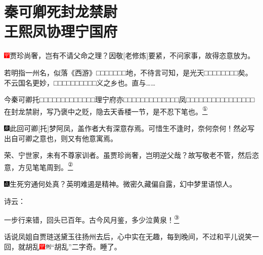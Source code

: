 

\chapter{秦可卿死封龙禁尉\\王熙凤协理宁国府}\label{part0017_split_000.htmlux5cux23calibre_pb_0}

\includegraphics[width=3mm]{../Images/00002}{贾珍尚奢，岂有不请父命之理？因敬{[}老修炼{]}要紧，不问家事，故得恣意放为。}

{若明指一州名，似落《西游》□□□□□□□地，不待言可知，是光天□□□□□□□□矣。不云国名更妙，□□□□□□□□□□义之乡也。直与\ldots{}\ldots{}}

{今秦可卿托□□□□□□□□□□□□□理宁府亦□□□□□□□□□□□□□凤□□□□□□□□□□□□□□□□在封龙禁尉，写乃褒中之贬，隐去天香楼一节，是不忍下笔也。}\href{../Text/part0017_split_000.html\#lnkback_1_a}{\textsuperscript{①}}

{{\includegraphics[width=3mm]{../Images/00004}此回可卿{[}托{]}梦阿凤，盖作者大有深意存焉。可惜生不逢时，奈何奈何！然必写出自可卿之意也，则又有他意寓焉。}}

{{荣、宁世家，未有不尊家训者。虽贾珍尚奢，岂明逆父哉？故写敬老不管，然后恣意，方见笔笔周到。}}\href{../Text/part0017_split_000.html\#lnkback_2_a}{\textsuperscript{②}}

{\includegraphics[width=3mm]{../Images/00005}生死穷通何处真？英明难遏是精神。微密久藏偏自露，幻中梦里语惊人。}

诗云：

一步行来错，回头已百年。古今风月鉴，多少泣黄泉！\href{../Text/part0017_split_000.html\#lnkback_3_a}{\textsuperscript{③}}

话说凤姐自贾琏送黛玉往扬州去后，心中实在无趣，每到晚间，不过和平儿说笑一回，就胡乱{\includegraphics[width=3mm]{../Images/00002}\includegraphics[width=3mm]{../Images/00011}\footnotesize \kaishu ``胡乱''二字奇。}睡了。

